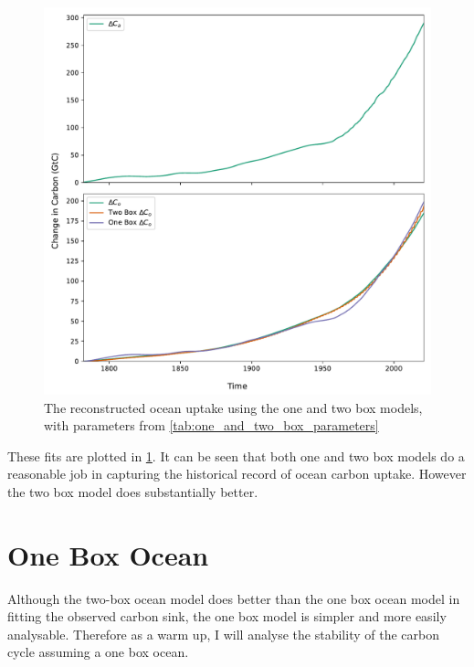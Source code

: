 \begin{figure}
  \centering
  \includegraphics[keepaspectratio,width=\textwidth]{gcb_ocean_atmosphere_boxes}
  \caption{The reconstructed ocean uptake using the one and two box models, with parameters from \cref{tab:one_and_two_box_parameters}}
  \label{fig:fits_from_one_and_two}
\end{figure}


These fits are plotted in \cref{fig:fits_from_one_and_two}. It can be seen that both one and two box models do a reasonable job in capturing the
historical record of ocean carbon uptake. However the two box model does substantially better.



\section{One Box Ocean}
Although the two-box ocean model does better than the one box ocean model in fitting the observed carbon sink, the one box model is simpler
and more easily analysable. Therefore as a warm up, I will analyse the stability of the carbon cycle assuming a one box ocean.

